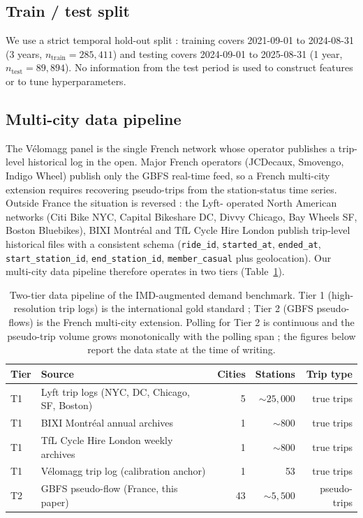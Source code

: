 \documentclass[11pt,a4paper]{article}
\begin{document}
\subsection{Train / test split}

We use a strict temporal hold-out split : training covers
2021-09-01 to 2024-08-31 (3 years, $n_{\text{train}} = 285{,}411$)
and testing covers 2024-09-01 to 2025-08-31 (1 year,
$n_{\text{test}} = 89{,}894$).  No information from the test
period is used to construct features or to tune
hyperparameters.

\subsection{Multi-city data pipeline}
\label{sec:multicity}

The V\'elomagg panel is the single French network whose
operator publishes a trip-level historical log in the open.
Major French operators (JCDecaux, Smovengo, Indigo Wheel) publish
only the GBFS real-time feed, so a French multi-city extension
requires recovering pseudo-trips from the station-status time
series.  Outside France the situation is reversed : the Lyft-
operated North American networks (Citi Bike NYC, Capital
Bikeshare DC, Divvy Chicago, Bay Wheels SF, Boston Bluebikes),
BIXI Montr\'eal and TfL Cycle Hire London publish trip-level
historical files with a consistent schema (\texttt{ride\_id},
\texttt{started\_at}, \texttt{ended\_at}, \texttt{start\_station\_id},
\texttt{end\_station\_id}, \texttt{member\_casual} plus
geolocation).  Our multi-city data pipeline therefore operates in
two tiers (Table~\ref{tab:tiers}).

\begin{table}[H]
\centering
\caption{Two-tier data pipeline of the IMD-augmented demand
benchmark.  Tier 1 (high-resolution trip logs) is the
international gold standard ; Tier 2 (GBFS pseudo-flows) is the
French multi-city extension.  Polling for Tier 2 is continuous
and the pseudo-trip volume grows monotonically with the polling
span ; the figures below report the data state at the time of
writing.}
\label{tab:tiers}
\small
\begin{tabular}{@{}llrrr@{}}
\toprule
Tier & Source & Cities & Stations & Trip type \\
\midrule
T1 & Lyft trip logs (NYC, DC, Chicago, SF, Boston) & 5 & $\sim 25{,}000$ & true trips \\
T1 & BIXI Montr\'eal annual archives           & 1 &  $\sim 800$  & true trips \\
T1 & TfL Cycle Hire London weekly archives     & 1 &  $\sim 800$  & true trips \\
T1 & V\'elomagg trip log (calibration anchor)   & 1 &      53      & true trips \\
\midrule
T2 & GBFS pseudo-flow (France, this paper)      & 43 & $\sim 5{,}500$ & pseudo-trips \\
\bottomrule
\end{tabular}
\end{table}
\end{document}
